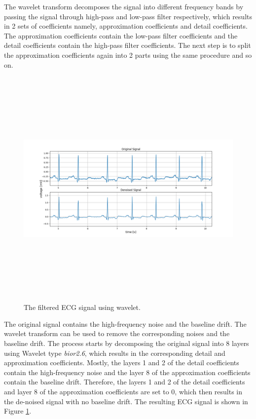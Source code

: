 The wavelet transform decomposes the signal into different frequency bands by passing the signal through high-pass and low-pass filter respectively, which results in 2 sets of coefficients namely, approximation coefficients and detail coefficients. The approximation coefficients contain the low-pass filter coefficients and the detail coefficients contain the high-pass filter coefficients. The next step is to split the approximation coefficients again into 2 parts using the same procedure and so on.

\begin{figure}[h]
	\centering
	\includegraphics[width=15cm,height=12cm,keepaspectratio=true]{images/wavelet_denoised_1}
	\caption{
		The filtered ECG signal using wavelet.
	}
	\label{fig:wavelet_denoised}
\end{figure}


The original signal contains the high-frequency noise and the baseline drift. The wavelet transform can be used to remove the corresponding noises and the baseline drift. The process starts by decomposing the original signal into 8 layers using Wavelet type \textit{bior2.6}, which results in the corresponding detail and approximation coefficients. Mostly, the layers 1 and 2 of the detail coefficients contain the high-frequency noise and the layer 8 of the approximation coefficients contain the baseline drift. Therefore, the layers 1 and 2 of the detail coefficients and layer 8 of the approximation coefficients are set to 0, which then results in the de-noised signal with no baseline drift. The resulting ECG signal is shown in Figure \ref{fig:wavelet_denoised}. 




